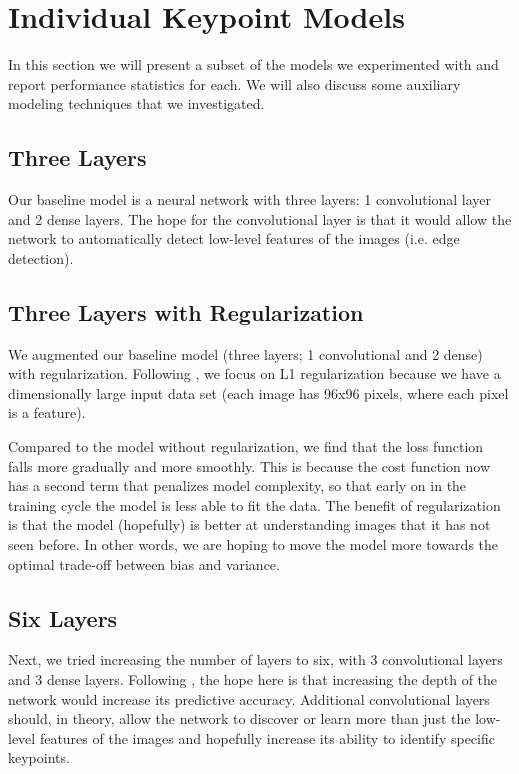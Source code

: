 \documentclass[journal]{IEEEtran}
\begin{document}



\section{Individual Keypoint Models}

In this section we will present a subset of the models we experimented with and report performance statistics for each. We will also discuss some auxiliary modeling techniques that we investigated.

\subsection{Three Layers}

Our baseline model is a neural network with three layers: 1 convolutional layer and 2 dense layers. The hope for the convolutional layer is that it would allow the network to automatically detect low-level features of the images (i.e. edge detection). 

\subsection{Three Layers with Regularization}

We augmented our baseline model (three layers; 1 convolutional and 2 dense) with regularization. Following \cite{ng2004feature}, we focus on L1 regularization because we have a dimensionally large input data set (each image has 96x96 pixels, where each pixel is a feature). 

Compared to the model without regularization, we find that the loss function falls more gradually and more smoothly. This is because the cost function now has a second term that penalizes model complexity, so that early on in the training cycle the model is less able to fit the data. The benefit of regularization is that the model (hopefully) is better at understanding images that it has not seen before. In other words, we are hoping to move the model more towards the optimal trade-off between bias and variance.

\subsection{Six Layers}

Next, we tried increasing the number of layers to six, with 3 convolutional layers and 3 dense layers. Following \cite{benlecun2007}, the hope here is that increasing the depth of the network would increase its predictive accuracy. Additional convolutional layers should, in theory, allow the network to discover or learn more than just the low-level features of the images and hopefully increase its ability to identify specific keypoints.
\end{document}
